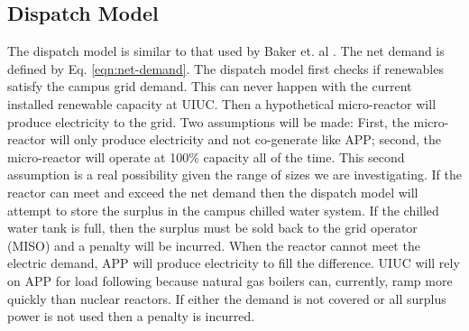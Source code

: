 \subsection{Dispatch Model}

The dispatch model is similar to that used by Baker et. al \cite{baker_optimal_2018}. The net demand is defined by 
Eq. \ref{eqn:net-demand}. The dispatch model first checks if renewables satisfy the campus grid demand. This can never happen with the current installed renewable capacity at UIUC. Then a hypothetical micro-reactor will produce electricity to the grid. Two assumptions will be made: First, the micro-reactor will only produce electricity and not co-generate like APP; second, the micro-reactor will operate at 100\% capacity all of the time. This second assumption is a real possibility given the range of sizes we are investigating. If the reactor can meet and exceed the net demand then the dispatch model will attempt to store the surplus in the campus chilled water system. If the chilled water tank is full, then the surplus must be sold back to the grid operator (MISO) and a penalty will be incurred. When the reactor cannot meet the electric demand, APP will produce electricity to fill the difference. UIUC will rely on APP for load following because natural gas boilers can, currently, ramp more quickly than nuclear reactors. If either the demand is not covered or all surplus power is not used then a penalty is incurred.
